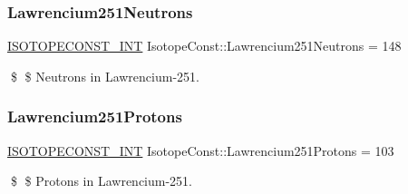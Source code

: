 \subsubsection{\texorpdfstring{Lawrencium251\+Neutrons}{Lawrencium251Neutrons}}
{\footnotesize\ttfamily \mbox{\hyperlink{group___isotope_const-_macros_ga5f18360b3e99483a35c32d789e62621c}{I\+S\+O\+T\+O\+P\+E\+C\+O\+N\+S\+T\+\_\+\+I\+NT}} Isotope\+Const\+::\+Lawrencium251\+Neutrons = 148}

\$ \$ Neutrons in Lawrencium-\/251. \mbox{\label{group___isotope_const-_lawrencium-_lr251_gaadc9ac4d9d020d0b805f35d9c0a819aa}} 
\subsubsection{\texorpdfstring{Lawrencium251\+Protons}{Lawrencium251Protons}}
{\footnotesize\ttfamily \mbox{\hyperlink{group___isotope_const-_macros_ga5f18360b3e99483a35c32d789e62621c}{I\+S\+O\+T\+O\+P\+E\+C\+O\+N\+S\+T\+\_\+\+I\+NT}} Isotope\+Const\+::\+Lawrencium251\+Protons = 103}

\$ \$ Protons in Lawrencium-\/251. 